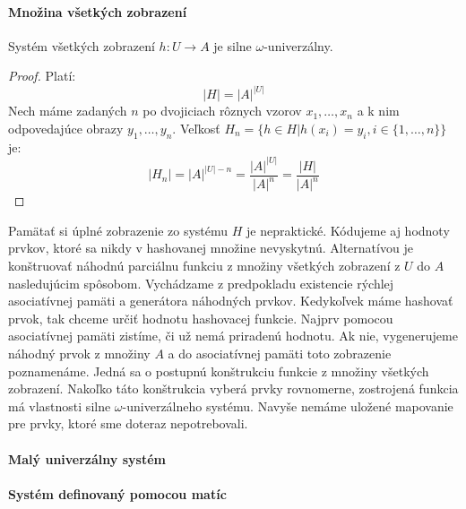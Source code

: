 \paragraph{Množina všetkých zobrazení}
\begin{remark}
Systém všetkých zobrazení $h: U \rightarrow A$ je silne $\omega$-univerzálny.
\end{remark}
\begin{proof}
Platí:
\begin{displaymath}
|H| = {|A|}^{|U|}
\end{displaymath}
Nech máme zadaných $n$ po dvojiciach rôznych vzorov $x_1, \dots, x_n$ a k nim odpovedajúce obrazy $y_1, \dots, y_n$. Veľkosť $H_n = \lbrace h \in H | h(x_i) = y_i, i \in \lbrace 1, \dots, n \rbrace \rbrace$ je:
\begin{displaymath}
|H_n| = {|A|}^{|U| - n} = \frac{{|A|}^{|U|}}{{|A|}^{n}} = \frac{|H|}{|A|^n}
\end{displaymath}
\end{proof}

Pamätať si úplné zobrazenie zo systému $H$ je nepraktické. Kódujeme aj hodnoty prvkov, ktoré sa nikdy v hashovanej množine nevyskytnú. Alternatívou je konštruovať náhodnú parciálnu funkciu z množiny všetkých zobrazení z $U$ do $A$ nasledujúcim spôsobom. Vychádzame z predpokladu existencie rýchlej asociatívnej pamäti a generátora náhodných prvkov. Kedykoľvek máme hashovať prvok, tak chceme určiť hodnotu hashovacej funkcie. Najprv pomocou asociatívnej pamäti zistíme, či už nemá priradenú hodnotu. Ak nie, vygenerujeme náhodný prvok z množiny $A$ a do asociatívnej pamäti toto zobrazenie poznamenáme. Jedná sa o postupnú konštrukciu funkcie z množiny všetkých zobrazení. Nakoľko táto konštrukcia vyberá prvky rovnomerne, zostrojená funkcia má vlastnosti silne $\omega$-univerzálneho systému. Navyše nemáme uložené mapovanie pre prvky, ktoré sme doteraz nepotrebovali.

\paragraph{Malý univerzálny systém}


\paragraph{Systém definovaný pomocou matíc}

